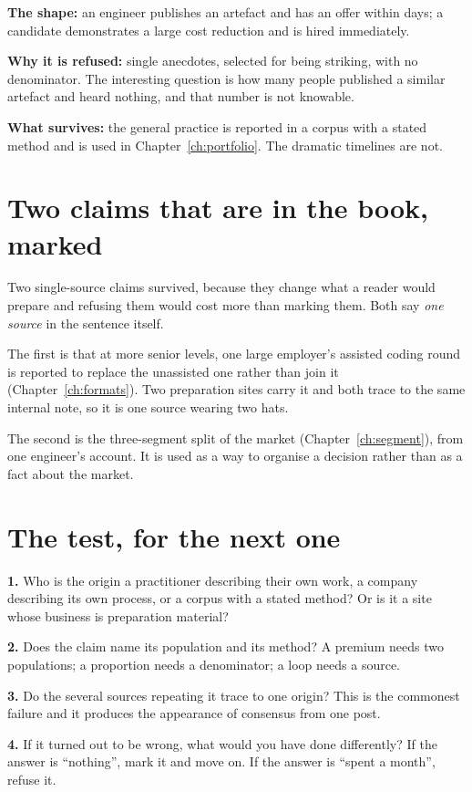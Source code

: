 \textbf{The shape:} an engineer publishes an artefact and has an offer within
days; a candidate demonstrates a large cost reduction and is hired immediately.

\textbf{Why it is refused:} single anecdotes, selected for being striking, with
no denominator. The interesting question is how many people published a similar
artefact and heard nothing, and that number is not knowable.

\textbf{What survives:} the general practice is reported in a corpus with a
stated method and is used in Chapter~\ref{ch:portfolio}. The dramatic timelines
are not.

\section{Two claims that are in the book, marked}

Two single-source claims survived, because they change what a reader would
prepare and refusing them would cost more than marking them. Both say
\emph{one source} in the sentence itself.

The first is that at more senior levels, one large employer's assisted coding
round is reported to replace the unassisted one rather than join it
(Chapter~\ref{ch:formats}). Two preparation sites carry it and both trace to
the same internal note, so it is one source wearing two hats.

The second is the three-segment split of the market
(Chapter~\ref{ch:segment}), from one engineer's account. It is used as a way to
organise a decision rather than as a fact about the market.


\section{The test, for the next one}

\begin{kitmethod}
\textbf{1.} Who is the origin \dash{} a practitioner describing their own work,
a company describing its own process, or a corpus with a stated method? Or is
it a site whose business is preparation material?

\textbf{2.} Does the claim name its population and its method? A premium needs
two populations; a proportion needs a denominator; a loop needs a source.

\textbf{3.} Do the several sources repeating it trace to one origin? This is
the commonest failure and it produces the appearance of consensus from one
post.

\textbf{4.} If it turned out to be wrong, what would you have done differently?
If the answer is ``nothing'', mark it and move on. If the answer is ``spent a
month'', refuse it.
\end{kitmethod}

